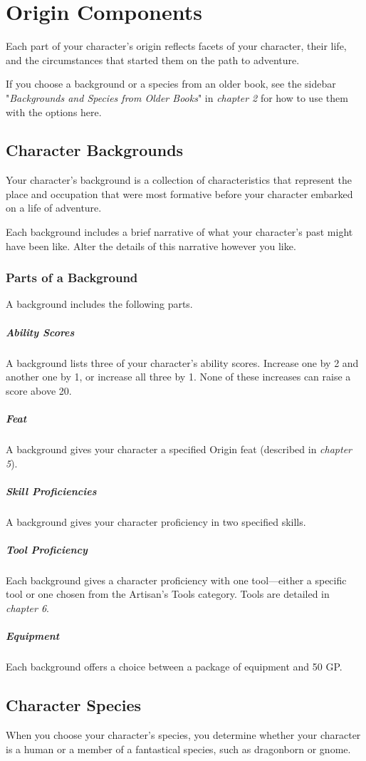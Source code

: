 \documentclass[10pt,a4paper,twoside,bg=print,twocolumn,openany,nodeprecatedcode]{dndbook}
\begin{document}
\section{Origin Components}
Each part of your character's origin reflects facets of your character, their life, and the circumstances that started them on the path to adventure.

If you choose a background or a species from an older book, see the sidebar "\textit{Backgrounds and Species from Older Books}" in \textit{chapter 2} for how to use them with the options here.

\subsection{Character Backgrounds}
Your character's background is a collection of characteristics that represent the place and occupation that were most formative before your character embarked on a life of adventure.

Each background includes a brief narrative of what your character's past might have been like. Alter the details of this narrative however you like.

\subsubsection{Parts of a Background}
A background includes the following parts.

\subparagraph{Ability Scores}
A background lists three of your character's ability scores. Increase one by 2 and another one by 1, or increase all three by 1. None of these increases can raise a score above 20.

\subparagraph{Feat}
A background gives your character a specified Origin feat (described in \textit{chapter 5}).

\subparagraph{Skill Proficiencies}
A background gives your character proficiency in two specified skills.

\subparagraph{Tool Proficiency}
Each background gives a character proficiency with one tool—either a specific tool or one chosen from the Artisan's Tools category. Tools are detailed in \textit{chapter 6}.

\subparagraph{Equipment}
Each background offers a choice between a package of equipment and 50 GP.

\subsection{Character Species}
When you choose your character's species, you determine whether your character is a human or a member of a fantastical species, such as dragonborn or gnome.
\end{document}
